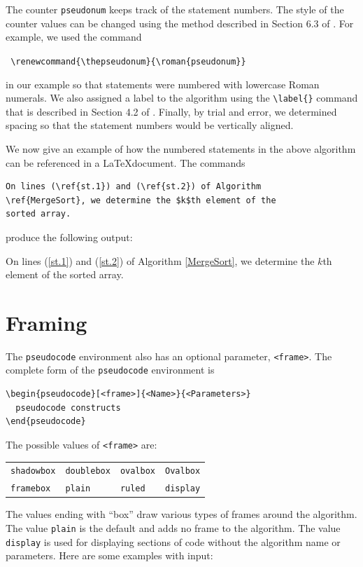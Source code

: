 \documentclass[a4]{article}
\newcommand{\keyword}[1]{\texttt{#1}}
\begin{document}
The counter \verb+pseudonum+ keeps track of the statement numbers.
The style of the counter values can be changed using the method
described in Section 6.3 of \cite{lamport}. For example,
we used the command
\begin{center}
\verb+ \renewcommand{\thepseudonum}{\roman{pseudonum}} +
\end{center}
in our example so that statements were numbered with 
lowercase Roman numerals.
We also assigned a label to the algorithm using the
\verb+\label{}+ command that is described in Section 4.2 of \cite{lamport}.
Finally, by trial and error, we determined 
spacing so that the statement numbers would be vertically aligned.

We now give an example of how the numbered statements in the above
algorithm can be referenced in a \LaTeX document.  The commands

\begin{verbatim}
On lines (\ref{st.1}) and (\ref{st.2}) of Algorithm 
\ref{MergeSort}, we determine the $k$th element of the 
sorted array.
\end{verbatim}

\noindent{}produce the following output:

\medskip 

\noindent{}On lines (\ref{st.1}) and (\ref{st.2}) of Algorithm \ref{MergeSort},  
we determine the $k$th element of the 
sorted array.




\section{Framing}
The \keyword{pseudocode} environment also has an optional parameter, 
\verb+<frame>+. The complete form of the \keyword{pseudocode} environment is

\begin{verbatim}
\begin{pseudocode}[<frame>]{<Name>}{<Parameters>}
  pseudocode constructs
\end{pseudocode}
\end{verbatim}

The possible values of  \verb+<frame>+ are:
\begin{center}
\begin{tabular}{llll}
\verb+shadowbox+ &
\verb+doublebox+ &
\verb+ovalbox+ &
\verb+Ovalbox+  \\
\verb+framebox+ &
\verb+plain+ &
\verb+ruled+ &
\verb+display+
\end{tabular}
\end{center}
The values ending with ``box'' draw various types of frames around the algorithm.
The value \verb+plain+ is the default and adds no frame to the algorithm.
The value \verb+display+ is used for displaying sections of code
without the algorithm name or parameters. Here are some examples with
input:
\end{document}
